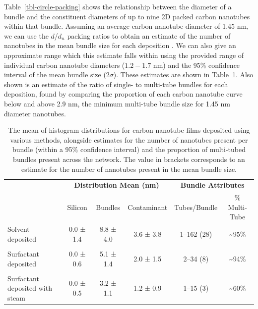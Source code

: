 \documentclass[
  a4paper,
]{scrbook}
\begin{document}
Table~\ref{tbl-circle-packing} shows the relationship between the
diameter of a bundle and the constituent diameters of up to nine 2D
packed carbon nanotubes within that bundle. Assuming an average carbon
nanotube diameter of 1.45 nm, we can use the \(d\)/\(d_n\) packing
ratios to obtain an estimate of the number of nanotubes in the mean
bundle size for each deposition \autocite{Specht2023}. We can also give
an approximate range which this estimate falls within using the provided
range of individual carbon nanotube diameters (\(1.2-1.7\) nm) and the
95\% confidence interval of the mean bundle size (\(2\sigma\)). These
estimates are shown in Table~\ref{tbl-histogram-parameters}. Also shown
is an estimate of the ratio of single- to multi-tube bundles for each
deposition, found by comparing the proportion of each carbon nanotube
curve below and above 2.9 nm, the minimum multi-tube bundle size for
1.45 nm diameter nanotubes.

\hypertarget{tbl-histogram-parameters}{}
\begin{table}
\caption{\label{tbl-histogram-parameters}The mean of histogram distributions for carbon nanotube films deposited
using various methods, alongside estimates for the number of nanotubes
present per bundle (within a 95\% confidence interval) and the
proportion of multi-tubed bundles present across the network. The value
in brackets corresponds to an estimate for the number of nanotubes
present in the mean bundle size. }\tabularnewline

\centering
\begin{tabular}{>{\raggedright\arraybackslash}p{2cm}ccccc}
\toprule
\multicolumn{1}{c}{\textbf{ }} & \multicolumn{3}{c}{\textbf{Distribution Mean (nm)}} & \multicolumn{2}{c}{\textbf{Bundle Attributes}} \\
\cmidrule(l{3pt}r{3pt}){2-4} \cmidrule(l{3pt}r{3pt}){5-6}
 & Silicon & Bundles & Contaminant & Tubes/Bundle & \% Multi-Tube\\
\midrule
Solvent deposited & 0.0 ± 1.4 & 8.8 ± 4.0 & 3.6 ± 3.8 & 1–162 (28) & \textasciitilde{}95\%\\
 &  &  &  &  \vphantom{1} & \\
Surfactant deposited & 0.0 ± 0.6 & 5.1 ± 1.4 & 2.0 ± 1.5 & 2–34 (8) & \textasciitilde{}94\%\\
 &  &  &  &  & \\
Surfactant deposited with steam & 0.0 ± 0.5 & 3.2 ± 1.1 & 1.2 ± 0.9 & 1–15 (3) & \textasciitilde{}60\%\\
\bottomrule
\end{tabular}
\end{table}
\end{document}
